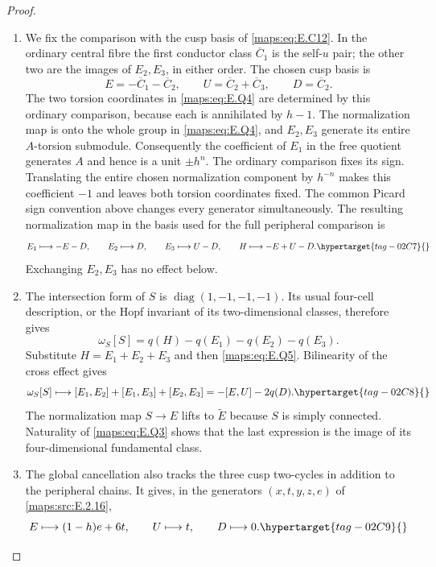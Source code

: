 \documentclass[11pt,a4paper]{article}
\numberwithin{equation}{section}
\theoremstyle{definition}
\begin{document}
\begin{proof}
\begin{enumerate}[label=\arabic*.,leftmargin=*]
\item We fix the comparison with the cusp basis of \eqref{maps:eq:E.C12}.  In the ordinary
central fibre the first conductor class $\overline C_1$ is the
self-$u$ pair; the other two are the images of $E_2,E_3$,
in either order.  The chosen cusp basis is
\[
 E=-\overline C_1-\overline C_2,\qquad
 U=\overline C_2+\overline C_3,\qquad D=\overline C_2.
\]
The two torsion coordinates in \eqref{maps:eq:E.Q4} are determined by
this ordinary comparison, because each is annihilated by
$h-1$.  The normalization map is onto the whole group in
\eqref{maps:eq:E.Q4}, and $E_2,E_3$ generate its entire $A$-torsion
submodule.  Consequently the coefficient of $E_1$ in the
free quotient generates $A$ and hence is a unit $\pm h^n$.  The ordinary comparison
fixes its sign.  Translating the entire chosen normalization
component by $h^{-n}$ makes this coefficient $-1$ and leaves
both torsion coordinates fixed.  The common Picard sign
convention above changes every generator simultaneously.
The resulting
normalization map in the basis used for the full peripheral
comparison is
\begin{equation}
 E_1\longmapsto-E-D,\qquad
 E_2\longmapsto D,\qquad E_3\longmapsto U-D,
 \qquad H\longmapsto-E+U-D.
 \hypertarget{tag-02C7}{}\label{maps:eq:E.Q5}
\end{equation}
Exchanging $E_2,E_3$ has no effect below.  \item The intersection form of $S$ is
$\operatorname{diag}(1,-1,-1,-1)$.  Its usual four-cell
description, or the Hopf invariant of its two-dimensional
classes, therefore gives
\[
 \omega_S[S]=q(H)-q(E_1)-q(E_2)-q(E_3).
\]
Substitute $H=E_1+E_2+E_3$ and then \eqref{maps:eq:E.Q5}.  Bilinearity
of the cross effect gives
\begin{equation}
 \omega_S[S]\longmapsto
 [E_1,E_2]+[E_1,E_3]+[E_2,E_3]
                      =-[E,U]-2q(D).
 \hypertarget{tag-02C8}{}\label{maps:eq:E.Q6}
\end{equation}
The normalization map $S\to E$ lifts to $\widetilde E$
because $S$ is simply connected.  Naturality of \eqref{maps:eq:E.Q3}
shows that the last expression is the image of its four-dimensional fundamental class.  \item The global cancellation also tracks the three cusp two-cycles in addition to the peripheral chains.  It gives, in the generators $(x,t,y,z,e)$ of
\ref{maps:src:E.2.16},
\begin{equation}
 E\longmapsto(1-h)e+6t,\qquad
 U\longmapsto t,\qquad D\longmapsto0.
 \hypertarget{tag-02C9}{}\label{maps:eq:E.Q7}

\end{equation}
\end{enumerate}
\end{proof}
\end{document}
